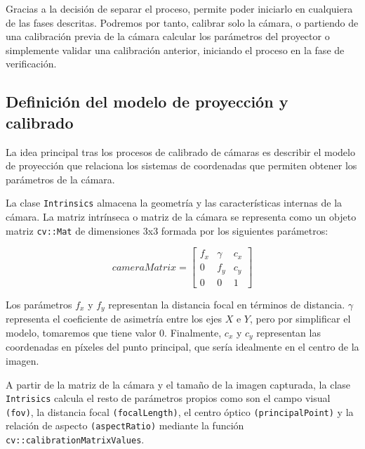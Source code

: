 Gracias a la decisión de separar el proceso, permite poder iniciarlo en cualquiera de las fases descritas. Podremos por tanto, calibrar solo la cámara, o partiendo de una calibración previa de la cámara calcular los parámetros del proyector o simplemente validar una calibración anterior, iniciando el proceso en la fase de verificación.  


\subsection{Definición del modelo de proyección y calibrado}
La idea principal tras los procesos de calibrado de cámaras es describir el modelo de proyección que relaciona los sistemas de coordenadas que permiten obtener los parámetros de la cámara. 

La clase \texttt{Intrinsics} almacena la geometría y las características internas de la cámara. La matriz intrínseca o matriz de la cámara se representa como un objeto matriz \texttt{cv::Mat} de dimensiones 3x3 formada por los siguientes parámetros:

\begin{equation}
cameraMatrix=
\begin{bmatrix}
f_{x} & \gamma & c_{x} \\
0    & f_{y}   & c_{y} \\
0    & 0      & 1
\end{bmatrix}
\end{equation}

Los parámetros $f_{x}$ y $f_{y}$ representan la distancia focal en términos de distancia. $\gamma$ representa el coeficiente de asimetría entre los ejes $X$ e $Y$, pero por simplificar el modelo, tomaremos que tiene valor 0. Finalmente, $c_{x}$ y $c_{y}$ representan las coordenadas en píxeles del punto principal, que sería idealmente en el centro de la imagen.

A partir de la matriz de la cámara y el tamaño de la imagen capturada, la clase \texttt{Intrisics} calcula el resto de parámetros propios como son el campo visual \texttt{(fov)}, la distancia focal \texttt{(focalLength)}, el centro óptico \texttt{(principalPoint)} y la relación de aspecto \texttt{(aspectRatio)} mediante la función \texttt{cv::calibrationMatrixValues}. 

